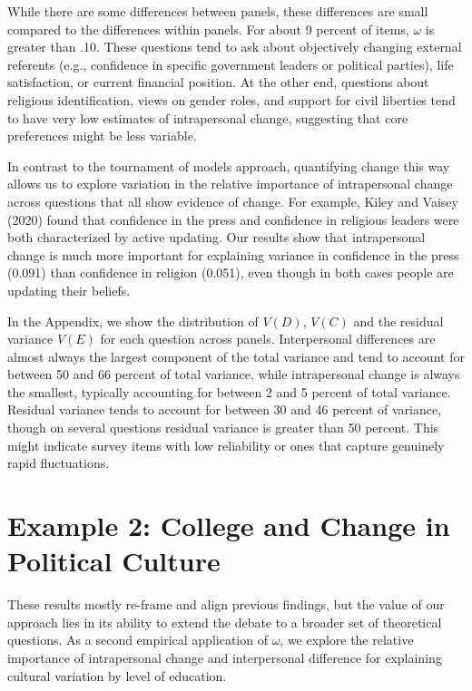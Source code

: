 \documentclass[
  11pt,
]{article}
\begin{document}
While there are some differences between panels, these differences are
small compared to the differences within panels. For about 9 percent of
items, \(\omega\) is greater than .10. These questions tend to ask about
objectively changing external referents (e.g., confidence in specific
government leaders or political parties), life satisfaction, or current
financial position. At the other end, questions about religious
identification, views on gender roles, and support for civil liberties
tend to have very low estimates of intrapersonal change, suggesting that
core preferences might be less variable.

In contrast to the tournament of models approach, quantifying change
this way allows us to explore variation in the relative importance of
intrapersonal change across questions that all show evidence of change.
For example, Kiley and Vaisey (2020) found that confidence in the press
and confidence in religious leaders were both characterized by active
updating. Our results show that intrapersonal change is much more
important for explaining variance in confidence in the press (0.091)
than confidence in religion (0.051), even though in both cases people
are updating their beliefs.

In the Appendix, we show the distribution of \(V(D)\), \(V(C)\) and the
residual variance \(V(E)\) for each question across panels.
Interpersonal differences are almost always the largest component of the
total variance and tend to account for between 50 and 66 percent of
total variance, while intrapersonal change is always the smallest,
typically accounting for between 2 and 5 percent of total variance.
Residual variance tends to account for between 30 and 46 percent of
variance, though on several questions residual variance is greater than
50 percent. This might indicate survey items with low reliability or
ones that capture genuinely rapid fluctuations.

\section{Example 2: College and Change in Political
Culture}\label{example-2-college-and-change-in-political-culture}

These results mostly re-frame and align previous findings, but the value
of our approach lies in its ability to extend the debate to a broader
set of theoretical questions. As a second empirical application of
\(\omega\), we explore the relative importance of intrapersonal change
and interpersonal difference for explaining cultural variation by level
of education.
\end{document}
